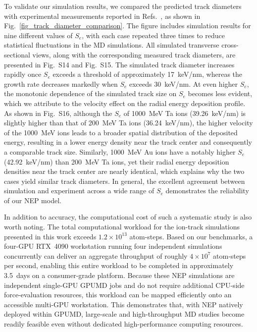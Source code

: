 \documentclass[aip,graphicx,amsmath,amssymb]{revtex4-1}
\begin{document}
To validate our simulation results, we compared the predicted track diameters with
experimental measurements reported in Refs.~,
as shown in Fig.~\ref{fig_track_diameter_comparison}.
The figure includes simulation results for nine different values of $S_e$, with each
case repeated three times to reduce statistical fluctuations in the MD simulations. 
All simulated transverse cross-sectional views, along with the corresponding measured 
track diameters, are presented in Fig.~S14 and Fig.~S15. 
The simulated track diameter increases rapidly once $S_e$ exceeds a threshold of 
approximately 17~keV/nm, whereas the growth rate decreases markedly when $S_e$ exceeds 30~keV/nm.
At even higher $S_e$, the monotonic dependence of the simulated track size on 
$S_e$ becomes less evident, which we attribute to the velocity effect on the radial 
energy deposition profile.
As shown in Fig.~S16, although the $S_e$ of 1000~MeV Ta ions (39.26~keV/nm) is slightly 
higher than that of 200~MeV Ta ions (36.24~keV/nm), the higher velocity of the 
1000~MeV ions leads to a broader spatial distribution of the deposited energy, resulting 
in a lower energy density near the track center and consequently a comparable track size.
Similarly, 1000~MeV Au ions have a notably higher $S_e$ (42.92~keV/nm) than 200~MeV Ta 
ions, yet their radial energy deposition densities near the track center are nearly 
identical, which explains why the two cases yield similar track diameters.
In general, the excellent agreement between simulation and experiment across a wide range of $S_e$ 
demonstrates the reliability of our NEP model.

In addition to accuracy, the computational cost of such a systematic study is also worth
noting. The total computational workload for the ion-track simulations presented
in this work exceeds $1.2\times10^{13}$ atom-steps.
Based on our benchmarks, a four-GPU RTX~4090 workstation running four independent 
simulations concurrently can deliver an aggregate throughput of roughly $4\times10^7$ 
atom-steps per second, enabling this entire workload to be completed in approximately 
3.5~days on a consumer-grade platform.
Because these NEP simulations are independent single-GPU GPUMD jobs and do not require
additional CPU-side force-evaluation resources, this workload can be mapped efficiently
onto an accessible multi-GPU workstation.
This demonstrates that, with NEP natively deployed within GPUMD, large-scale and 
high-throughput MD studies become readily feasible even without dedicated 
high-performance computing resources.
\end{document}
